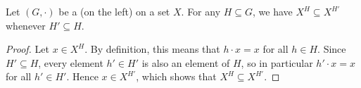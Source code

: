 \begin{proposition} \label{proposition:fixed_point_set_of_group_action_is_antitone_in_subgroup}
    Let $(G,\cdot)$ be a   (on the left) on a set $X$.
    For any  $H \subseteq G$, we have $X^H \subseteq X^{H'}$ whenever $H' \subseteq H$.
\end{proposition}
\begin{proof}
    Let $x \in X^H$. By definition, this means that $h \cdot x = x$ for all $h \in H$. Since $H' \subseteq H$, every element $h' \in H'$ is also an element of $H$, so in particular $h' \cdot x = x$ for all $h' \in H'$. Hence $x \in X^{H'}$, which shows that $X^H \subseteq X^{H'}$.
\end{proof}
